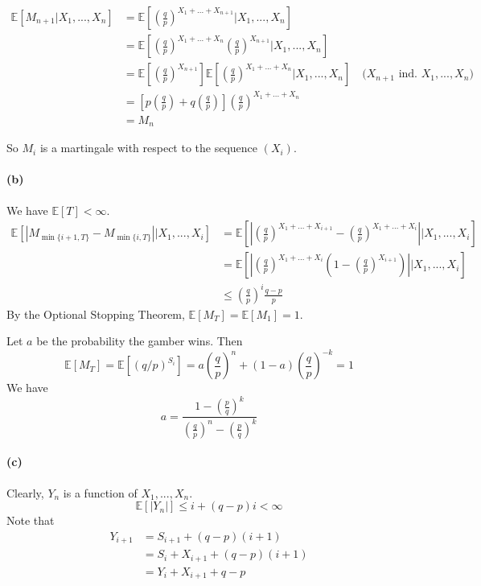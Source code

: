 \documentclass[11pt]{article} %
\begin{document}
\begin{equation}
\begin{aligned}  
\mathbb{E}[M_{n+1}|X_1,...,X_n]
&=\mathbb{E}\left[\left(\frac{q}{p}\right)^{X_1+...+X_{n+1}}|X_1,...,X_n\right]\\
&=\mathbb{E}\left[\left(\frac{q}{p}\right)^{X_1+...+X_n}
\left(\frac{q}{p}\right)^{X_{n+1}}|X_1,...,X_n\right]\\
&=\mathbb{E}\left[\left(\frac{q}{p}\right)^{X_{n+1}}\right]
\mathbb{E}\left[\left(\frac{q}{p}\right)^{X_1+...+X_n}|X_1,...,X_n\right]
\quad\text{($X_{n+1}$ ind. $X_1,...,X_n$)}\\
&=\left[p\left(\frac{q}{p}\right) + q\left(\frac{q}{p}\right)\right]
\left(\frac{q}{p}\right)^{X_1+...+X_n}\\
&=M_n
\end{aligned}
\end{equation}

So $M_i$ is a martingale with respect to the sequence $(X_i)$.

\clearpage
\paragraph{(b)}
We have $\mathbb{E}[T] < \infty$.
\begin{equation}
\begin{aligned}
\mathbb{E}[|M_{\min\{i+1,T\}} - M_{\min\{i,T\}}||X_1,...,X_i]
&= \mathbb{E}\left[\left|\left(\frac{q}{p}\right)^{X_1+...+X_{i+1}} 
- \left(\frac{q}{p}\right)^{X_1+...+X_i}\right||X_1,...,X_i\right]\\
&= \mathbb{E}\left[\left|\left(\frac{q}{p}\right)^{X_1+...+X_i}
\left(1-\left(\frac{q}{p}\right)^{X_{i+1}}\right)\right||X_1,...,X_i\right]\\
&\leq\left(\frac{q}{p}\right)^i \frac{q-p}{p}
\end{aligned}
\end{equation}
By the Optional Stopping Theorem, $\mathbb{E}[M_T]=\mathbb{E}[M_1] = 1$.

Let $a$ be the probability the gamber wins. Then
\[\mathbb{E}[M_T]=\mathbb{E}[(q/p)^{S_i}]
=a\left(\frac{q}{p}\right)^n + (1-a)\left(\frac{q}{p}\right)^{-k} = 1\]
We have
\[a=\frac{1-\left(\frac{p}{q}\right)^k}{\left(\frac{q}{p}\right)^n - \left(\frac{p}{q}\right)^k}\]

\paragraph{(c)}
Clearly, $Y_n$ is a function of $X_1,...,X_n$.
\[\mathbb{E}[|Y_n|] \leq i + (q-p)i < \infty\]
Note that 
\begin{equation}
\begin{aligned}
Y_{i+1} &= S_{i+1} + (q-p)(i+1)\\
&= S_i + X_{i+1} + (q-p)(i+1)\\
&= Y_i + X_{i+1} + q-p
\end{aligned}
\end{equation}
\end{document}

